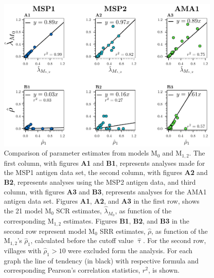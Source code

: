 \begin{figure}[H]
\centering
\begin{adjustbox}{width=\linewidth}
\includegraphics[width=\columnwidth]{images/M0vM12.pdf}
\end{adjustbox}
\caption[Correlation analyses between parameter estimates from M$_0$ and M$_ {1,2}$]{Comparison of parameter estimates from models M$_0$ and M$_{1,2}$. The first column, with figures \textbf{A1} and \textbf{B1}, represents analyses made for the MSP1 antigen data set, the second column, with figures \textbf{A2} and \textbf{B2}, represents analyses using the MSP2 antigen data, and third column, with figures \textbf{A3} and \textbf{B3}, represents analyses for the AMA1 antigen data set. Figures \textbf{A1}, \textbf{A2}, and \textbf{A3} in the first row, shows the 21 model M$_0$ SCR estimates, $ \widehat{\lambda}_{M_0}$, as function of the corresponding M$_{1,2}$ estimates. Figures \textbf{B1}, \textbf{B2}, and \textbf{B3} in the second row represent model M$_0$ SRR estimates, $ \widehat{\rho}$, as function of the M$_{1,2}$'s $ \widehat{\rho}_1$, calculated before the cutoff value $ \widehat{\uptau}$. For the second row, villages with $ \widehat{\rho}_1>10$ were excluded form the analysis. For each graph the line of tendency (in black) with respective formula and corresponding Pearson's correlation statistics, $r^2$, is shown.}
\label{fig:comparisons.M0.M12}
\end{figure}


